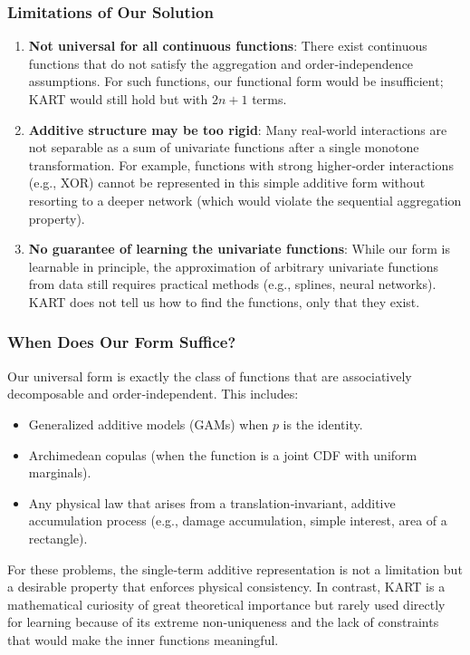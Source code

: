 \subsubsection*{Limitations of Our Solution}
\begin{enumerate}
\item \textbf{Not universal for all continuous functions}: There exist continuous functions that do not satisfy the aggregation and order‑independence assumptions. For such functions, our functional form would be insufficient; KART would still hold but with $2n+1$ terms.
\item \textbf{Additive structure may be too rigid}: Many real‑world interactions are not separable as a sum of univariate functions after a single monotone transformation. For example, functions with strong higher‑order interactions (e.g., XOR) cannot be represented in this simple additive form without resorting to a deeper network (which would violate the sequential aggregation property).
\item \textbf{No guarantee of learning the univariate functions}: While our form is learnable in principle, the approximation of arbitrary univariate functions from data still requires practical methods (e.g., splines, neural networks). KART does not tell us how to find the functions, only that they exist.
\end{enumerate}

\subsubsection*{When Does Our Form Suffice?}
Our universal form is exactly the class of functions that are associatively decomposable and order‑independent. This includes:
\begin{itemize}
\item Generalized additive models (GAMs) when $p$ is the identity.
\item Archimedean copulas (when the function is a joint CDF with uniform marginals).
\item Any physical law that arises from a translation‑invariant, additive accumulation process (e.g., damage accumulation, simple interest, area of a rectangle).
\end{itemize}
For these problems, the single‑term additive representation is not a limitation but a desirable property that enforces physical consistency. In contrast, KART is a mathematical curiosity of great theoretical importance but rarely used directly for learning because of its extreme non‑uniqueness and the lack of constraints that would make the inner functions meaningful.


